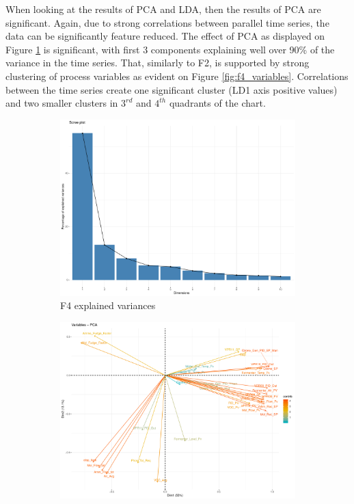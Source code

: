 When looking at the results of PCA and LDA, then the results of PCA are significant. Again, due to strong correlations between parallel time series, the data can be significantly feature reduced. The effect of PCA as displayed on Figure \ref{fig:f4_explained_variances} is significant, with first 3 components explaining well over 90\% of the variance in the time series. That, similarly to F2, is supported by strong clustering of process variables as evident on Figure \ref{fig:f4_variables}. Correlations between the time series create one significant cluster (LD1 axis positive values) and two smaller clusters in $3^{rd}$ and $4^{th}$ quadrants of the chart.

\begin{figure}
    \begin{subfigure}{0.3\textwidth}
        \begin{center}
            \includegraphics[width=\textwidth]{plots/f4_explained_variances.pdf}        
        \end{center}
        \caption{F4 explained variances}
        \label{fig:f4_explained_variances}
    \end{subfigure}%
    \begin{subfigure}{0.3\textwidth}
        \begin{center}
        \includegraphics[width=\textwidth]{plots/f4_graph_of_variables.pdf}

\end{center}
\end{subfigure}
\end{figure}
